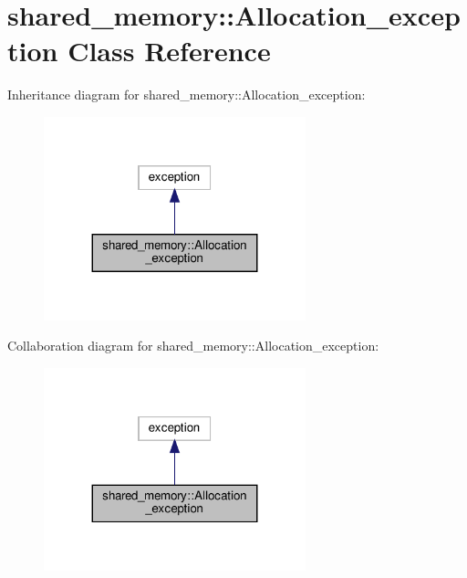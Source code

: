 \hypertarget{classshared__memory_1_1Allocation__exception}{}\section{shared\+\_\+memory\+:\+:Allocation\+\_\+exception Class Reference}
\label{classshared__memory_1_1Allocation__exception}


Inheritance diagram for shared\+\_\+memory\+:\+:Allocation\+\_\+exception\+:
\nopagebreak
\begin{figure}[H]
\begin{center}
\leavevmode
\includegraphics[width=215pt]{classshared__memory_1_1Allocation__exception__inherit__graph}
\end{center}
\end{figure}


Collaboration diagram for shared\+\_\+memory\+:\+:Allocation\+\_\+exception\+:
\nopagebreak
\begin{figure}[H]
\begin{center}
\leavevmode
\includegraphics[width=215pt]{classshared__memory_1_1Allocation__exception__coll__graph}
\end{center}
\end{figure}
